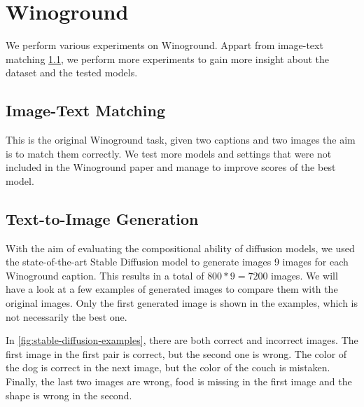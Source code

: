 \section{Winoground}

We perform various experiments on Winoground. Appart from image-text matching \ref{image_text_matching}, we perform more experiments to gain more insight about the dataset and the tested models.

\subsection{Image-Text Matching} \label{image_text_matching}

This is the original Winoground task, given two captions and two images the aim is to match them correctly. We test more models and settings that were not included in the Winoground paper and manage to improve scores of the best model.

\subsection{Text-to-Image Generation} \label{text_to_image_generation}

With the aim of evaluating the compositional ability of diffusion models, we used the state-of-the-art Stable Diffusion model \cite{rombach2021highresolution} to generate images 9 images for each Winoground caption. This results in a total of $800*9=7200$ images. We will have a look at a few examples of generated images to compare them with the original images. Only the first generated image is shown in the examples, which is not necessarily the best one.

In \cref{fig:stable-diffusion-examples}, there are both correct and incorrect images. The first image in the first pair is correct, but the second one is wrong. The color of the dog is correct in the next image, but the color of the couch is mistaken. Finally, the last two images are wrong, food is missing in the first image and the shape is wrong in the second.

